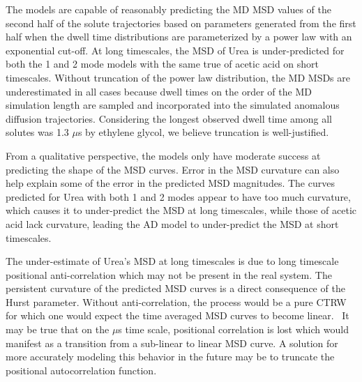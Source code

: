 \documentclass{article}
\begin{document}
  The models are capable of reasonably predicting the MD MSD values of the second
  half of the solute trajectories based on parameters generated from the first half
  when the dwell time distributions are parameterized by a power law with an 
  exponential cut-off. At long timescales, the MSD of Urea is under-predicted 
  for both the 1 and 2 mode models with the same true of acetic acid on short 
  timescales. Without truncation of the power law distribution, the MD 
  MSDs are underestimated in all cases because dwell times on the order of the
  MD simulation length are sampled and incorporated into the simulated anomalous
  diffusion trajectories. Considering the longest observed dwell time among all
  solutes was 1.3 $\mu$s by ethylene glycol, we believe truncation is well-justified.
  
  
  From a qualitative perspective, the models only have moderate success at predicting
  the shape of the MSD curves. Error in the MSD curvature can also help explain some of
  the error in the predicted MSD magnitudes. The curves predicted for Urea with both 1 
  and 2 modes appear to have too much curvature, which causes it to under-predict the 
  MSD at long timescales, while those of acetic acid lack curvature, leading the
  AD model to under-predict the MSD at short timescales. 
  
  The under-estimate of Urea's MSD at long timescales is due to long timescale
  positional anti-correlation which may not be present in the real system. The 
  persistent curvature of the predicted MSD curves is a direct consequence of 
  the Hurst parameter. Without anti-correlation, the process would be 
  a pure CTRW for which one would expect the time averaged MSD curves to become 
  linear.~\cite{meroz_toolbox_2015} It may be true that on the $\mu$s time scale, 
  positional correlation is lost which would manifest as a transition from a sub-linear
  to linear MSD curve. A solution for more accurately modeling this behavior in  
  the future may be to truncate the positional autocorrelation function.~\cite{molina-garcia_crossover_2018}
  
\end{document}
